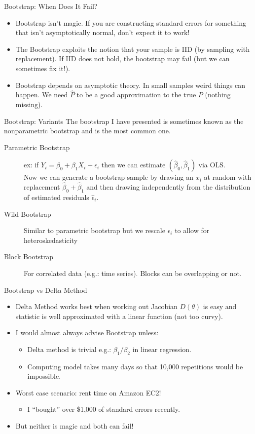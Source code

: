 \begin{frame}{Bootstrap: When Does It Fail?}
\begin{itemize}
\item Bootstrap isn't magic. If you are constructing standard errors for something that isn't asymptotically normal, don't expect it to work!
\item The Bootstrap exploits the notion that your sample is IID (by sampling with replacement). If IID does not hold, the bootstrap may fail (but we can sometimes fix it!).
\item Bootstrap depends on asymptotic theory. In small samples weird things can happen. We need $\hat{P}$ to be a good approximation to the true $P$ (nothing missing).
\end{itemize}
\end{frame}

\begin{frame}{Bootstrap: Variants}
The bootstrap I have presented is sometimes known as the \alert{nonparametric bootstrap} and is the most common one.
\begin{description}
\item[Parametric Bootstrap] ex: if $Y_i = \beta_0 + \beta_1 X_i + \epsilon_i$ then we can estimate $(\hat{\beta}_0,\hat{\beta}_1)$ via OLS.\\
 Now we can generate a bootstrap sample by drawing an $x_i$ at random with replacement $\hat{\beta}_0 + \hat{\beta}_1$ and then drawing \alert{independently} from the distribution of estimated residuals $\hat{\epsilon}_i$.
 \item[Wild Bootstrap] Similar to parametric bootstrap but we rescale $\epsilon_i$ to allow for \alert{heteroskedasticity}
\item[Block Bootstrap] For correlated data (e.g.: time series). Blocks can be overlapping or not.  
\end{description}
\end{frame}

\begin{frame}{Bootstrap vs Delta Method}
\begin{itemize}
\item Delta Method works best when working out Jacobian $D(\theta)$ is easy and statistic is well approximated with a linear function (not too curvy).
\item I would almost always advise Bootstrap unless:
\begin{itemize}
\item Delta method is trivial e.g.: $\beta_1 / \beta_2$ in linear regression.
\item Computing model takes many days so that 10,000 repetitions would be impossible.
\end{itemize}
\item Worst case scenario: rent time on Amazon EC2!
\begin{itemize}
\item I ``bought'' over \$1,000 of standard errors recently.
\end{itemize}
\item But neither is magic and both can fail!
\end{itemize}
\end{frame}


